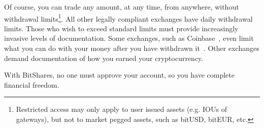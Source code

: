 Of course, you can trade any amount, at any time, from anywhere, without
withdrawal limits\footnote{Restricted access may only apply to user issued
assets (e.g. IOUs of gateways), but not to market pegged assets, such as
bitUSD, bitEUR, etc.}. All other legally compliant exchanges have daily
withdrawal limits. Those who wish to exceed standard limits must provide
increasingly invasive levels of documentation. Some exchanges, such as
Coinbase~\cite{coinbase}, even limit what you can do with your money after you
have withdrawn it~\cite{ct:compliance}. Other exchanges demand documentation of
how you earned your cryptocurrency.

With BitShares, no one must approve your account, so you have complete
financial freedom.
